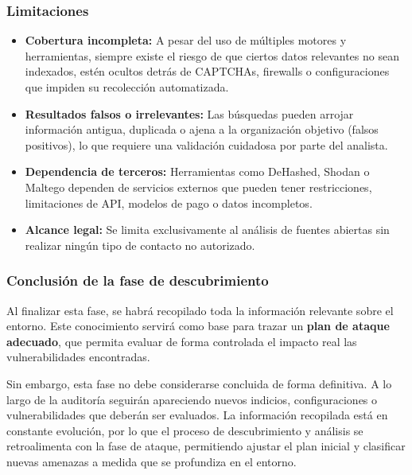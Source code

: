\documentclass[a4paper, 11pt]{article}
\begin{document}
\subsubsection*{Limitaciones}

\begin{itemize}
\item \textbf{Cobertura incompleta:} A pesar del uso de múltiples motores y herramientas, siempre existe el riesgo de que ciertos datos relevantes no sean indexados, estén ocultos detrás de CAPTCHAs, firewalls o configuraciones que impiden su recolección automatizada.

\item \textbf{Resultados falsos o irrelevantes:} Las búsquedas pueden arrojar información antigua, duplicada o ajena a la organización objetivo (falsos positivos), lo que requiere una validación cuidadosa por parte del analista.    

\item \textbf{Dependencia de terceros:} Herramientas como DeHashed, Shodan o Maltego dependen de servicios externos que pueden tener restricciones, limitaciones de API, modelos de pago o datos incompletos.

\item \textbf{Alcance legal:} Se limita exclusivamente al análisis de fuentes abiertas sin realizar ningún tipo de contacto no autorizado.
\end{itemize}






\subsubsection*{Conclusión de la fase de descubrimiento}

Al finalizar esta fase, se habrá recopilado toda la información relevante sobre el entorno. 
Este conocimiento servirá como base para trazar un \textbf{plan de ataque adecuado}, que 
permita evaluar de forma controlada el impacto real las vulnerabilidades encontradas.


Sin embargo, esta fase no debe considerarse concluida de forma definitiva. A lo largo de la auditoría seguirán apareciendo nuevos indicios, configuraciones o vulnerabilidades que deberán ser evaluados. La información recopilada está en constante evolución, por lo que el proceso de descubrimiento y análisis se retroalimenta con la fase de ataque, permitiendo ajustar el plan inicial y clasificar nuevas amenazas a medida que se profundiza en el entorno.
\end{document}
